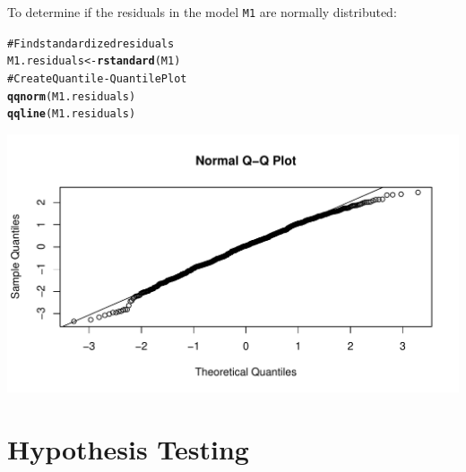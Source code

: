 \documentclass{beamer}\usepackage{graphicx, color}
\makeatletter
\def\maxwidth{ %
  \ifdim\Gin@nat@width>\linewidth
    \linewidth
  \else
    \Gin@nat@width
  \fi
}
\newcommand{\hlfunctioncall}[1]{\textcolor[rgb]{0.501960784313725,0,0.329411764705882}{\textbf{#1}}}%
\newcommand{\hlcomment}[1]{\textcolor[rgb]{0.180392156862745,0.6,0.341176470588235}{#1}}%
\newenvironment{kframe}{%
 \def\at@end@of@kframe{}%
 \ifinner\ifhmode%
  \def\at@end@of@kframe{\end{minipage}}%
  \begin{minipage}{\columnwidth}%
 \fi\fi%
 \def\FrameCommand##1{\hskip\@totalleftmargin \hskip-\fboxsep
 \colorbox{shadecolor}{##1}\hskip-\fboxsep
     \hskip-\linewidth \hskip-\@totalleftmargin \hskip\columnwidth}%
 \MakeFramed {\advance\hsize-\width
   \@totalleftmargin\z@ \linewidth\hsize
   \@setminipage}}%
 {\par\unskip\endMakeFramed%
 \at@end@of@kframe}
\newenvironment{knitrout}{}{} %
\makeatother
\begin{document}
\begin{frame}
  {\small{To determine if the residuals in the model \texttt{M1} are normally distributed:}}
\begin{knitrout}
\color{fgcolor}\begin{kframe}
\begin{alltt}
\hlcomment{# Find standardized residuals}
M1.residuals <- \hlfunctioncall{rstandard}(M1)
\hlcomment{# Create Quantile-Quantile Plot}
\hlfunctioncall{qqnorm}(M1.residuals)
\hlfunctioncall{qqline}(M1.residuals)
\end{alltt}
\end{kframe}

{\centering \includegraphics[width=\maxwidth]{figure/NormallyDistributed} 

}


\end{knitrout}

\end{frame}

\section{Hypothesis Testing}

\end{document}
